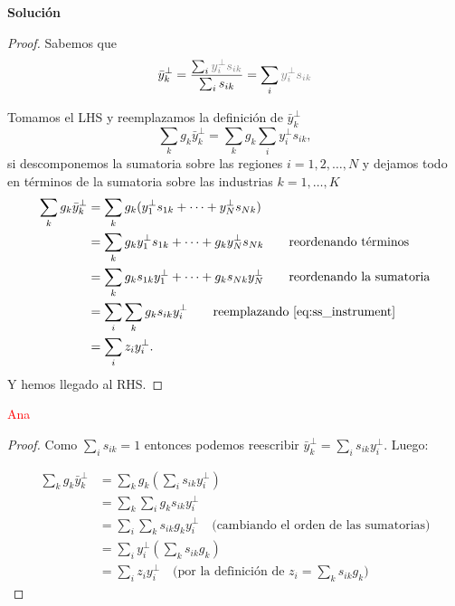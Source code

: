 \documentclass[a4paper, answers, addpoints, 11pt]{exam}
\newenvironment{solucion}{%
  \begin{mdframed}[
    backgroundcolor=blue!5,    %
    linecolor=blue!50,          %
    linewidth=2pt,              %
    leftmargin=10pt,            %
    rightmargin=8pt,           %
    topline=true,              %
    bottomline=true,            %
    roundcorner=10pt,           %
    innerleftmargin=10pt,       %
    innerrightmargin=10pt,      %
    innerbottommargin=10pt,     %
    innertopmargin=10pt         %
  ]%
  \begin{tcolorbox}[colframe=blue!50!black, colback=blue!50, coltitle=white, sharp corners=all, boxrule=1mm, width=\textwidth, halign=left, valign=center, top=0mm, bottom=0mm, left=0mm, right=0mm] \textbf{Solución} \end{tcolorbox} }{\end{mdframed}}
\begin{document}
\begin{enumerate}
\begin{enumerate}[label=\alph*)]
\begin{solucion}
\begin{proof}
        Sabemos que 
        \begin{equation}
            \bar{y}^\perp_k =\frac{\sum_i\textcolor{gray}{y_i^\perp s_{ik}} }{\sum_is_{ik}}= \sum_i\textcolor{gray}{y_i^\perp s_{ik}}
        \end{equation}

        Tomamos el LHS y reemplazamos la definición de $\bar{y}_k^\perp$
        \begin{equation}
        \sum_k g_k\bar{y}^\perp_k = \sum_kg_k\sum_iy_i^\perp s_{ik},
        \end{equation}
        si descomponemos la sumatoria sobre las regiones $i=1,2,\dots,N$ y dejamos todo en términos de la sumatoria sobre las industrias $k=1,\dots,K$
        \begin{align}
            \sum_k g_k\bar{y}^\perp_k &=\sum_kg_k(y_1^\perp s_{1k}+\dots+y_N^\perp s_{Nk} ) \notag \\
            &= \sum_kg_ky_1^\perp s_{1k}+\dots+g_k y_N^\perp s_{Nk} \qquad \text{reordenando términos}  \notag \\
            &= \sum_kg_ks_{1k}y_1^\perp +\dots+g_k s_{Nk} y_N^\perp \notag  \qquad \text{reordenando la sumatoria} \\
            &= \sum_i\sum_kg_ks_{ik}y_i^\perp \qquad \text{reemplazando \ref{eq:ss_instrument} } \notag \\
            &= \sum_i z_iy_i^\perp.
        \end{align}
        Y hemos llegado al RHS.
        
        \end{proof}

         \textcolor{red}{Ana}
         \begin{proof}
         Como $\sum_i s_{ik}=1$ entonces podemos reescribir $\bar{y}_k^\perp = \sum_i s_{ik} y_i^\perp$. Luego:
        
             \begin{align*}
    \sum_k g_k \bar{y}_k^\perp 
    &= \sum_k g_k \left( \sum_i s_{ik} y_i^\perp \right) \\[5pt]
    &= \sum_k \sum_i g_k s_{ik} y_i^\perp \\[5pt]
    &= \sum_i \sum_k s_{ik} g_k y_i^\perp \quad \text{(cambiando el orden de las sumatorias)} \\[5pt]
    &= \sum_i y_i^\perp \left( \sum_k s_{ik} g_k \right) \\[5pt]
    &= \sum_i z_i y_i^\perp \quad \text{(por la definición de } z_i = \sum_k s_{ik} g_k \text{)}
\end{align*}
         \end{proof}
        

\end{solucion}
\end{enumerate}
\end{enumerate}
\end{document}
